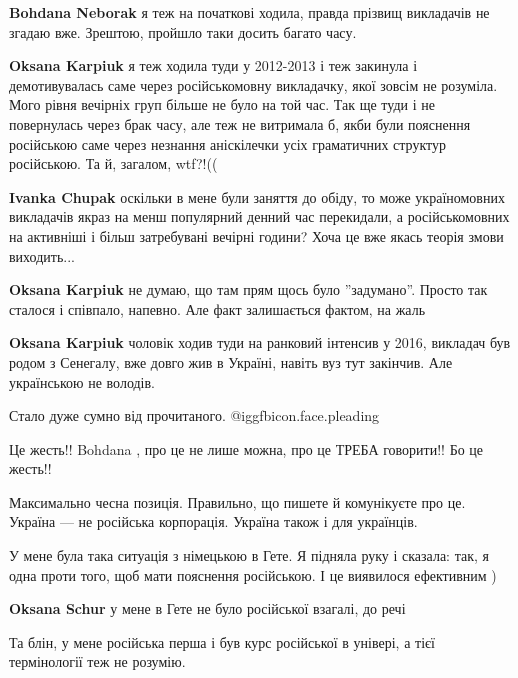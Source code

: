 \begin{itemize}
\begin{itemize}
\textbf{Bohdana Neborak} я теж на початкові ходила, правда прізвищ викладачів не згадаю вже. Зрештою, пройшло таки досить багато часу.

\textbf{Oksana Karpiuk} я теж ходила туди у 2012-2013 і теж закинула і демотивувалась саме через російськомовну викладачку, якої зовсім не розуміла. Мого рівня вечірніх груп більше не було на той час. Так ще туди і не повернулась через брак часу, але теж не витримала б, якби були пояснення російською саме через незнання аніскілечки усіх граматичних структур російською. Та й, загалом, wtf?!((

\textbf{Ivanka Chupak} оскільки в мене були заняття до обіду, то може україномовних викладачів якраз на менш популярний денний час перекидали, а російськомовних на активніші і більш затребувані вечірні години? Хоча це вже якась теорія змови виходить...

\textbf{Oksana Karpiuk} не думаю, що там прям щось було ''задумано''. Просто так сталося і співпало, напевно. Але факт залишається фактом, на жаль

\textbf{Oksana Karpiuk} чоловік ходив туди на ранковий інтенсив у 2016, викладач був родом з Сенегалу, вже довго жив в Україні, навіть вуз тут закінчив. Але українською не володів.
\end{itemize} %

Стало дуже сумно від прочитаного. @igg{fbicon.face.pleading} 

Це жесть!! Bohdana , про це не лише можна, про це ТРЕБА говорити!! Бо це жесть!!

Максимально чесна позиція. Правильно, що пишете й комунікуєте про це. Україна —
не російська корпорація. Україна також і для українців.


У мене була така ситуація з німецькою в Гете. Я підняла руку і сказала: так, я
одна проти того, щоб мати пояснення російською. І це виявилося ефективним )

\begin{itemize} %
\textbf{Oksana Schur} у мене в Гете не було російської взагалі, до речі
\end{itemize} %

Та блін, у мене російська перша і був курс російської в універі, а тієї термінології теж не розумію.


\end{itemize}
